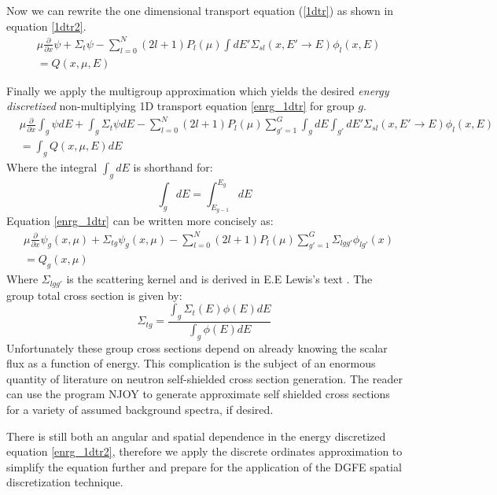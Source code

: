 Now we can rewrite the one dimensional transport equation (\ref{1dtr}) as shown in equation \ref{1dtr2}.
\begin{eqnarray}
& \mu \frac{\partial}{\partial x} \psi + \Sigma_t \psi -
\sum_{l=0}^N (2l+1) P_l(\mu) \int dE' \Sigma_{sl}(x, E'\rightarrow E) \phi_l(x, E)  
 \nonumber \\
& =
Q(x, \mu, E)
\label{1dtr2}
\end{eqnarray}

Finally we apply the multigroup approximation which yields the desired \emph{energy discretized} non-multiplying 1D transport equation \ref{enrg_1dtr} for group $g$.
\begin{eqnarray}
& \mu \frac{\partial}{\partial x} \int_g \psi dE + \int_g \Sigma_t \psi dE -
\sum_{l=0}^N (2l+1) P_l(\mu) 
\sum_{g'=1}^G \int_g dE \int_{g'} dE' \Sigma_{sl}(x, E'\rightarrow E) \phi_l(x, E)  
 \nonumber \\
& =
\int_g Q(x, \mu, E) dE
\label{enrg_1dtr}
\end{eqnarray}
Where the integral $\int_g dE$ is shorthand for:
\begin{equation}
\int_g dE = \int_{E_{g-1}}^{E_g} dE
\end{equation}
Equation \ref{enrg_1dtr} can be written more concisely as:
\begin{eqnarray}
& \mu \frac{\partial}{\partial x} \psi_g(x,\mu) + \Sigma_{tg} \psi_g(x,\mu) -
\sum_{l=0}^N (2l+1) P_l(\mu) 
\sum_{g'=1}^G \Sigma_{lgg'} \phi_{lg'}(x)
 \nonumber \\
& =
Q_g(x, \mu)
\label{enrg_1dtr2}
\end{eqnarray}
Where $\Sigma_{lgg'}$ is the scattering kernel and is derived in E.E Lewis's text \cite{Lewis}.
The group total cross section is given by:
\begin{equation}
\Sigma_{tg} = \frac{\int_g \Sigma_t(E)\phi (E) dE} {\int_g \phi (E) dE}
\end{equation}
Unfortunately these group cross sections depend on already knowing the scalar flux as a function of energy.  This complication is the subject of an enormous quantity of literature on neutron self-shielded cross section generation.  The reader can use the program NJOY to generate approximate self shielded cross sections for a variety of assumed background spectra, if desired.

There is still both an angular and spatial dependence in the energy discretized equation \ref{enrg_1dtr2}, therefore we apply the discrete ordinates approximation to simplify the equation further and prepare for the application of the DGFE spatial discretization technique.

